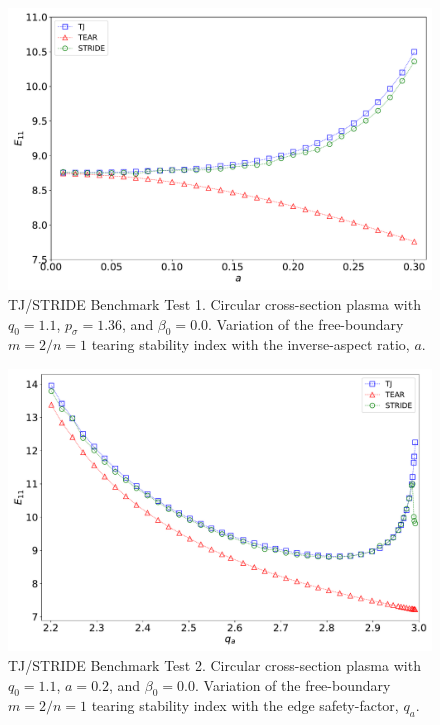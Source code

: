 \documentclass[12pt,prb,aps]{revtex4-1}
\begin{document}
\newpage
\begin{figure}
\centerline{\includegraphics[width=\textwidth]{Fig1.pdf}}
\caption{TJ/STRIDE Benchmark Test 1. Circular cross-section plasma with  $q_0=1.1$, $p_\sigma=1.36$,  and $\beta_0=0.0$. Variation of the  free-boundary $m=2/n=1$ tearing stability index with the inverse-aspect ratio, $a$. \label{fig1}}
\end{figure}

\begin{figure}
\centerline{\includegraphics[width=\textwidth]{Fig2.pdf}}
\caption{TJ/STRIDE Benchmark Test 2. Circular cross-section plasma with  $q_0=1.1$, $a=0.2$, and $\beta_0=0.0$. Variation of the free-boundary  $m=2/n=1$ tearing stability index with  the edge safety-factor, $q_a$.\label{fig2} }
\end{figure}
\end{document}
